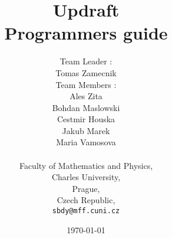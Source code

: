 \documentclass[12pt,a4paper]{refart}
\begin{document}

\title{Updraft \\ Programmers guide}
 \author{Team Leader : \\
	Tomas Zamecnik \\
	Team Members : \\
	Ales Zita \\
	Bohdan Maslowski \\
	Cestmir Houska \\
	Jakub Marek \\
	Maria Vamosova \\
	\\
   Faculty of Mathematics and Physics,\\
   Charles University,\\
   Prague,\\
   Czech Republic,\\
   \texttt{sbdy@mff.cuni.cz}}
 \date{\today}




\clearpage
 
\pagestyle{headings}


\setcounter{secnumdepth}{1}
\setcounter{tocdepth}{2}
\tableofcontents



\end{document}
